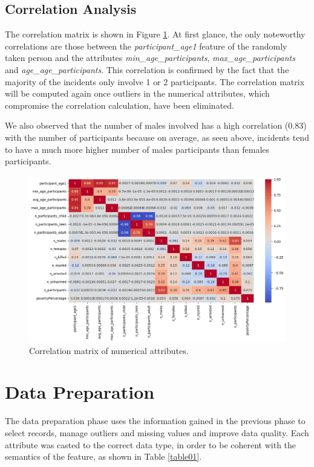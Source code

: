 \documentclass[10pt,a4paper]{report}
\begin{document}
\section{Correlation Analysis}

The correlation matrix is shown in Figure \ref{corr_matrix_du}.
At first glance, the only noteworthy correlations are those between the \textit{participant\_age1} feature of the randomly taken person and the attributes \textit{min\_age\_participants}, \textit{max\_age\_participants} and \textit{age\_age\_participants}.
This correlation is confirmed by the fact that the majority of the incidents only involve 1 or 2 participants. 
The correlation matrix will be computed again once outliers in the numerical attributes, which compromise the correlation calculation, have been eliminated.

We also observed that the number of males involved has a high correlation (0.83) with the number of participants because on average, as seen above, incidents tend to have a much more higher number of males participants than females participants.

\begin{figure}[h]
	\includegraphics[width=1\textwidth]{corr_matrix_du}
	\centering
	\caption{Correlation matrix of numerical attributes.}
	\label{corr_matrix_du}
\end{figure}


\chapter{Data Preparation}

The data preparation phase uses the information gained in the previous phase to select records, manage outliers and missing values and improve data quality.
Each attribute was casted to the correct data type, in order to be coherent with the semantics of the feature, as shown in Table \ref{table01}.
\end{document}
